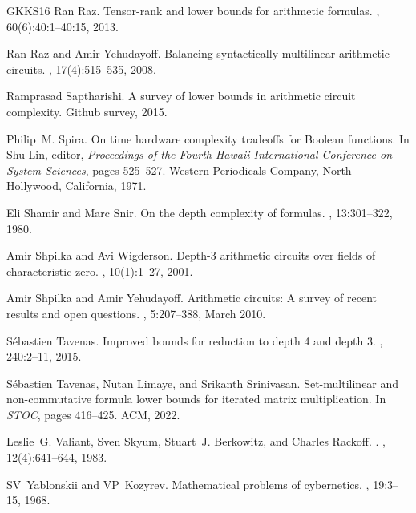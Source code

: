 \documentclass[10pt,a4paper]{article}
\begin{document}
\begin{thebibliography}{GKKS16}
Ran Raz.
\newblock Tensor-rank and lower bounds for arithmetic formulas.
, 60(6):40:1--40:15, 2013.

Ran Raz and Amir Yehudayoff.
\newblock Balancing syntactically multilinear arithmetic circuits.
, 17(4):515--535, 2008.

Ramprasad Saptharishi.
\newblock A survey of lower bounds in arithmetic circuit complexity.
\newblock Github survey, 2015.

Philip~M. Spira.
\newblock On time hardware complexity tradeoffs for {B}oolean functions.
\newblock In Shu Lin, editor, {\em Proceedings of the Fourth Hawaii
  International Conference on System Sciences}, pages 525--527. Western
  Periodicals Company, North Hollywood, California, 1971.

Eli Shamir and Marc Snir.
\newblock On the depth complexity of formulas.
, 13:301--322, 1980.

Amir Shpilka and Avi Wigderson.
\newblock Depth-3 arithmetic circuits over fields of characteristic zero.
, 10(1):1--27, 2001.

Amir Shpilka and Amir Yehudayoff.
\newblock Arithmetic circuits: A survey of recent results and open questions.
,
  5:207--388, March 2010.

S{\'{e}}bastien Tavenas.
\newblock Improved bounds for reduction to depth 4 and depth 3.
, 240:2--11, 2015.

S{\'{e}}bastien Tavenas, Nutan Limaye, and Srikanth Srinivasan.
\newblock Set-multilinear and non-commutative formula lower bounds for iterated
  matrix multiplication.
\newblock In {\em {STOC}}, pages 416--425. {ACM}, 2022.

Leslie~G. Valiant, Sven Skyum, Stuart~J. Berkowitz, and Charles Rackoff.
.
, 12(4):641--644, 1983.

SV~Yablonskii and VP~Kozyrev.
\newblock Mathematical problems of cybernetics.
, 19:3--15, 1968.

\end{thebibliography}
\end{document}
